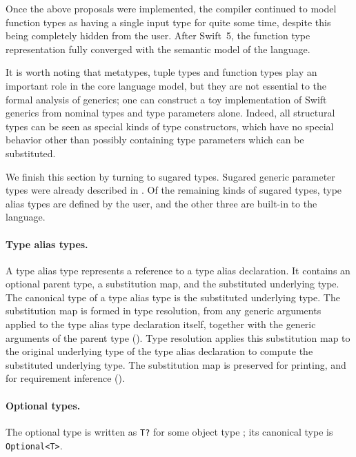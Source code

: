\documentclass[../generics]{subfiles}
\begin{document}
Once the above proposals were implemented, the compiler continued to model function types as having a single input type for quite some time, despite this being completely hidden from the user. After Swift~5, the function type representation fully converged with the semantic model of the language.

It is worth noting that metatypes, tuple types and function types play an important role in the core language model, but they are not essential to the formal analysis of generics; one can construct a toy implementation of Swift generics from nominal types and type parameters alone. Indeed, all structural types can be seen as special kinds of type constructors, which have no special behavior other than possibly containing type parameters which can be substituted.

\smallskip

We finish this section by turning to sugared types. Sugared generic parameter types were already described in . Of the remaining kinds of sugared types, type alias types are defined by the user, and the other three are built-in to the language.

\paragraph{Type alias types.} A type alias type represents a reference to a type alias declaration. It contains an optional parent type, a substitution map, and the substituted underlying type. The canonical type of a type alias type is the substituted underlying type. The substitution map is formed in type resolution, from any generic arguments applied to the type alias type declaration itself, together with the generic arguments of the parent type (). Type resolution applies this substitution map to the original underlying type of the type alias declaration to compute the substituted underlying type. The substitution map is preserved for printing, and for requirement inference ().

\paragraph{Optional types.} The optional type is written as \texttt{T?} for some object type \tT; its canonical type is \texttt{Optional<T>}.
\end{document}
